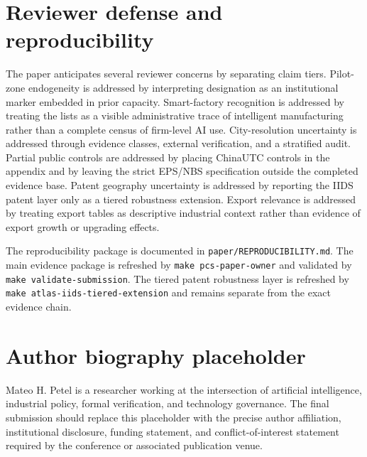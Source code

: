 \documentclass[12pt]{article}
\begin{document}
\section{Reviewer defense and reproducibility}
\label{app:reviewer_defense}

The paper anticipates several reviewer concerns by separating claim tiers. Pilot-zone endogeneity is addressed by interpreting designation as an institutional marker embedded in prior capacity. Smart-factory recognition is addressed by treating the lists as a visible administrative trace of intelligent manufacturing rather than a complete census of firm-level AI use. City-resolution uncertainty is addressed through evidence classes, external verification, and a stratified audit. Partial public controls are addressed by placing ChinaUTC controls in the appendix and by leaving the strict EPS/NBS specification outside the completed evidence base. Patent geography uncertainty is addressed by reporting the IIDS patent layer only as a tiered robustness extension. Export relevance is addressed by treating export tables as descriptive industrial context rather than evidence of export growth or upgrading effects.

The reproducibility package is documented in \texttt{paper/REPRODUCIBILITY.md}. The main evidence package is refreshed by \texttt{make pcs-paper-owner} and validated by \texttt{make validate-submission}. The tiered patent robustness layer is refreshed by \texttt{make atlas-iids-tiered-extension} and remains separate from the exact evidence chain.

\section{Author biography placeholder}
\label{app:author_bio}

Mateo H. Petel is a researcher working at the intersection of artificial intelligence, industrial policy, formal verification, and technology governance. The final submission should replace this placeholder with the precise author affiliation, institutional disclosure, funding statement, and conflict-of-interest statement required by the conference or associated publication venue.


\end{document}
